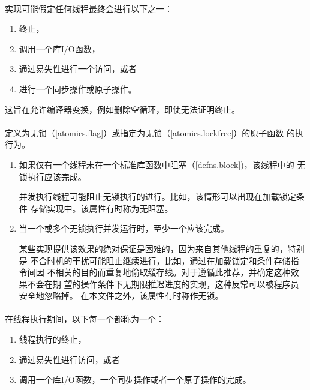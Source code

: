 \paragraph{} %
实现可能假定任何线程最终会进行以下之一：
\begin{enumerate}
  \item 终止，
  \item 调用一个库I/O函数，
  \item 通过易失性\glvalue{}进行一个访问，或者
  \item 进行一个同步操作或原子操作。
\end{enumerate}
\begin{note}
  这旨在允许编译器变换，例如删除空循环，即使无法证明终止。
\end{note}

\paragraph{} %
定义为无锁（\ref{atomics.flag}）或指定为无锁（\ref{atomics.lockfree}）的原子函数
的执行为。
\begin{enumerate}
  \item 如果仅有一个线程未在一个标准库函数中阻塞（\ref{defns.block})，该线程中的
        无锁执行应该完成。

        \begin{note}
          并发执行线程可能阻止无锁执行的进行。比如，该情形可以出现在加载锁定条件
          存储实现中。该属性有时称为无阻塞。
        \end{note}
  \item 当一个或多个无锁执行并发运行时，至少一个应该完成。

        \begin{note}
          某些实现提供该效果的绝对保证是困难的，因为来自其他线程的重复的，特别是
          不合时机的干扰可能阻止继续进行，比如，通过在加载锁定和条件存储指令间因
          不相关的目的而重复地偷取缓存线。对于遵循此推荐，并确定这种效果不会在期
          望的操作条件下无期限推迟进度的实现，这种反常可以被程序员安全地忽略掉。
          在本文件之外，该属性有时称作无锁。
        \end{note}
\end{enumerate}

\paragraph{} %
在线程执行期间，以下每一个都称为一个：
\begin{enumerate}
  \item 线程执行的终止，
  \item 通过易失性\glvalue{}进行访问，或者
  \item 调用一个库I/O函数，一个同步操作或者一个原子操作的完成。
\end{enumerate}

